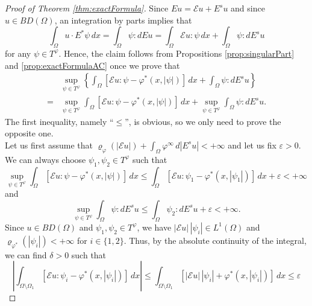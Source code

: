 \documentclass[a4paper,11pt,oneside,notitlepage]{article}
\numberwithin{equation}{section}
\newcommand{\e}{\varepsilon}
\newcommand{\vphi}{\varphi}
\newcommand{\vrho}{\varrho}
\newcommand{\E}{\mathcal{E}}
\begin{document}
\begin{proof}[Proof of Theorem \ref{thm:exactFormula}]
    Since $Eu = \E u + E^su$ and since $u \in BD(\Omega)$, an integration by parts implies that 
    \begin{equation*}
        \int_\Omega u \cdot E^*\psi \, dx = \int_\Omega \psi : dEu = \int_\Omega \E u : \psi \, dx + \int_\Omega \psi : dE^su
    \end{equation*}
    for any $\psi \in T^\vphi$. Hence, the claim follows from Propositions \ref{prop:singularPart} and \ref{prop:exactFormulaAC} once we prove that
    \begin{equation*}
    \begin{aligned}
        &\sup_{\psi \in T^\vphi} \left\{\int_\Omega [\E u : \psi - \vphi^*(x, |\psi|)] \, dx + \int_\Omega \psi : dE^su \right\} \\
        = &\sup_{\psi \in T^\vphi} \int_\Omega [\E u : \psi - \vphi^*(x, |\psi|)] \, dx + \sup_{\psi \in T^\vphi} \int_\Omega \psi : dE^su. 
    \end{aligned}
    \end{equation*}
    The first inequality, namely ``$\le$'', is obvious, so we only need to prove the opposite one.
    \\
    Let us first assume that $\vrho_\vphi(|\E u|) + \int_\Omega \vphi^\infty \, d|E^su| < +\infty$ and let us fix $\e > 0$. We can always choose $\psi_1, \psi_2\in T^\vphi$ such that 
    \begin{equation}
    \label{eq_aux:choice_1}
        \sup_{\psi \in T^\vphi} \int_\Omega [\E u : \psi - \vphi^*(x, |\psi|)] \, dx \le \int_\Omega [\E u : \psi_1 - \vphi^*(x, |\psi_1|)] \, dx + \e < +\infty
    \end{equation}
    and
    \begin{equation}
    \label{eq_aux:choice_2}
        \sup_{\psi \in T^\vphi} \int_\Omega \psi : dE^su \le \int_\Omega \psi_2 : dE^su + \e < +\infty.
    \end{equation}
    Since $u \in BD(\Omega)$ and $\psi_1, \psi_2 \in T^\vphi$, we have $|\E u|\,|\psi_i| \in L^1(\Omega)$ and $\vrho_{\vphi^*}(|\psi_i|) < +\infty$ for $i \in \{1,2\}$. Thus, by the absolute continuity of the integral, we can find $\delta > 0$ such that 
    \begin{equation}
    \label{eq_aux:stima_1_2}
        \left| \int_{\Omega \setminus \Omega_1} [\E u :  \psi_i - \vphi^*(x, |\psi_i|)] \, dx \right| \le \int_{\Omega \setminus \Omega_1} [|\E u| \, |\psi_i| + \vphi^*(x, |\psi_i|)] \, dx \le \e
    \end{equation}

\end{proof}
\end{document}
